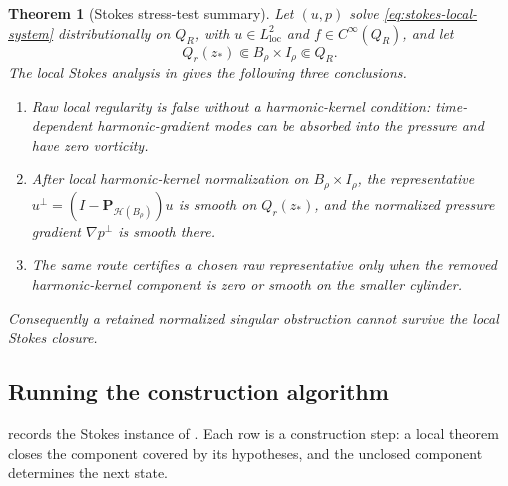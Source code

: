 \documentclass[11pt]{article}
\theoremstyle{plain}
\newtheorem{theorem}{Theorem}[section]
\theoremstyle{definition}
\theoremstyle{remark}
\newcommand{\calH}{\mathcal H}
\newcommand{\proj}{\mathbf P}
\begin{document}
\begin{theorem}[Stokes stress-test summary]
\label{thm:normalized-stokes-closure}
Let \((u,p)\) solve \eqref{eq:stokes-local-system} distributionally on
\(Q_R\), with \(u\in L^2_{\mathrm{loc}}\) and \(f\in C^\infty(Q_R)\), and let
\[
  Q_r(z_*)\Subset B_\rho\times I_\rho\Subset Q_R.
\]
The local Stokes analysis in  gives the following
three conclusions.
\begin{enumerate}
  \item Raw local regularity is false without a harmonic-kernel condition:
  time-dependent harmonic-gradient modes can be absorbed into the pressure and
  have zero vorticity.
  \item After local harmonic-kernel normalization on
  \(B_\rho\times I_\rho\), the representative
  \(u^\perp=(I-\proj_{\calH(B_\rho)})u\) is smooth on \(Q_r(z_*)\), and the
  normalized pressure gradient \(\nabla p^\perp\) is smooth there.
  \item The same route certifies a chosen raw representative only when the
  removed harmonic-kernel component is zero or smooth on the smaller cylinder.
\end{enumerate}
Consequently a retained normalized singular obstruction cannot survive the
local Stokes closure.
\end{theorem}

\subsection{Running the construction algorithm}
 records the Stokes instance of
.  Each row is a construction step:
a local theorem closes the component covered by its hypotheses, and the
unclosed component determines the next state.
\end{document}
